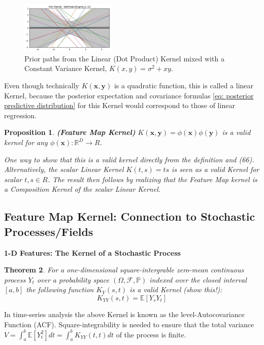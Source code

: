 \documentclass[11pt]{article}
\theoremstyle{plain} %
\newtheorem{theorem}{Theorem}[section]
\newtheorem{proposition}[theorem]{Proposition}
\theoremstyle{remark}
\begin{document}
\begin{figure}[!htp]
  \centering
  \includegraphics[width=0.4\textwidth]{images/2023_11_26_5b299dbd302e8f129737g-35}
  \caption{Prior paths from the Linear (Dot Product) Kernel mixed with a Constant Variance Kernel, $K(x, y)=\sigma^{2}+x y$.}
  \label{fig:Linear (Dot Product) Kernel}
\end{figure}

Even though technically $K(\mathbf{x}, \mathbf{y})$ is a quadratic function,
this is called a linear Kernel, because the posterior expectation and covariance
formulas \cref{eq: posterior predictive distribution} for this Kernel would correspond to those of linear regression.

\begin{proposition}\textbf{(Feature Map Kernel)}
  $K(\mathbf{x}, \mathbf{y})=\phi(\mathbf{x}) \phi(\mathbf{y})$ is a valid
  kernel for any $\phi(\mathbf{x}): \mathbb{R}^{D} \rightarrow R$.

  One way to show that this is a valid kernel directly from the
  definition and (66). Alternatively, the scalar Linear Kernel $K(t, s)=t s$ is
  seen as a valid Kernel for scalar $t, s \in R$. The result then follows by
  realizing that the Feature Map kernel is a Composition Kernel of the scalar
  Linear Kernel.
\end{proposition}


\subsection{Feature Map Kernel: Connection to Stochastic Processes/Fields}
\textbf{1-D Features: The Kernel of a Stochastic Process}

\begin{theorem}
  For a one-dimensional square-intergrable zero-mean continuous process $Y_{t}$
over a probability space $(\Omega, \mathcal{F}, \mathbb{P})$ indexed over the closed
interval $[a, b]$ the following function $K_{Y}(s, t)$ is a valid Kernel (show
this!):
$$
  K_{Y Y}(s, t)=\mathbb{E}\left[Y_{s} Y_{t}\right]
$$
\end{theorem}

In time-series analysis the above Kernel is known as the level-Autocovariance
Function (ACF). Square-integrability is needed to ensure that the total variance $V=\int_{a}^{b}
  \mathbb{E}\left[Y_{t}^{2}\right] d t=\int_{a}^{b} K_{Y Y}(t, t) d t$ of the
process is finite.
\end{document}
